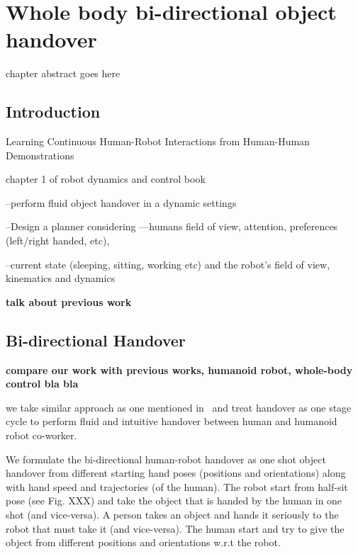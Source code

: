 \documentclass[a4paper, 12pt, oneside]{Thesis}  %
\begin{document}

{\color{brown}\chapter{Whole body bi-directional object handover}}

chapter abstract goes here


\clearpage
\section{Introduction}

Learning Continuous Human-Robot Interactions from Human-Human Demonstrations ~\cite{vogt2017system}

chapter 1 of robot dynamics and control book~\cite{spong2008robot}

--perform fluid object handover in a dynamic settings

--Design a planner considering —humans field of view, attention, preferences (left/right handed, etc),

--current state (sleeping, sitting, working etc) and the robot’s field of view, kinematics and dynamics

\textbf{talk about previous work}

\clearpage

\section{Bi-directional Handover}

\textbf{compare our work with previous works, humanoid robot, whole-body control bla bla}

we take similar approach as one mentioned in~\cite{medina2016human} and treat handover as one stage cycle to perform fluid and intuitive handover between human and humanoid robot co-worker.

We formulate the bi-directional human-robot handover as one shot object handover from different starting hand poses (positions and orientations) along with hand speed and trajectories (of the human). The robot start from half-sit pose (see Fig. XXX) and take the object that is handed by the human in one shot (and vice-versa). A person takes an object and hands it seriously to the robot that must take it (and vice-versa). The human start and try to give the object from different positions and orientations w.r.t the robot.
\end{document}

